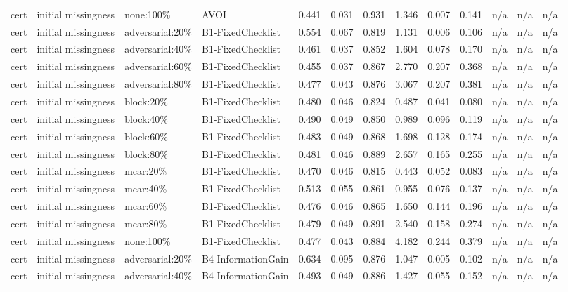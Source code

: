 \begin{table}[!ht]
{\begin{tabular}{lllllllllllll}
cert & initial missingness & none:100\% & AVOI & 0.441 & 0.031 & 0.931 & 1.346 & 0.007 & 0.141 & n/a & n/a & n/a \\
cert & initial missingness & adversarial:20\% & B1-FixedChecklist & 0.554 & 0.067 & 0.819 & 1.131 & 0.006 & 0.106 & n/a & n/a & n/a \\
cert & initial missingness & adversarial:40\% & B1-FixedChecklist & 0.461 & 0.037 & 0.852 & 1.604 & 0.078 & 0.170 & n/a & n/a & n/a \\
cert & initial missingness & adversarial:60\% & B1-FixedChecklist & 0.455 & 0.037 & 0.867 & 2.770 & 0.207 & 0.368 & n/a & n/a & n/a \\
cert & initial missingness & adversarial:80\% & B1-FixedChecklist & 0.477 & 0.043 & 0.876 & 3.067 & 0.207 & 0.381 & n/a & n/a & n/a \\
cert & initial missingness & block:20\% & B1-FixedChecklist & 0.480 & 0.046 & 0.824 & 0.487 & 0.041 & 0.080 & n/a & n/a & n/a \\
cert & initial missingness & block:40\% & B1-FixedChecklist & 0.490 & 0.049 & 0.850 & 0.989 & 0.096 & 0.119 & n/a & n/a & n/a \\
cert & initial missingness & block:60\% & B1-FixedChecklist & 0.483 & 0.049 & 0.868 & 1.698 & 0.128 & 0.174 & n/a & n/a & n/a \\
cert & initial missingness & block:80\% & B1-FixedChecklist & 0.481 & 0.046 & 0.889 & 2.657 & 0.165 & 0.255 & n/a & n/a & n/a \\
cert & initial missingness & mcar:20\% & B1-FixedChecklist & 0.470 & 0.046 & 0.815 & 0.443 & 0.052 & 0.083 & n/a & n/a & n/a \\
cert & initial missingness & mcar:40\% & B1-FixedChecklist & 0.513 & 0.055 & 0.861 & 0.955 & 0.076 & 0.137 & n/a & n/a & n/a \\
cert & initial missingness & mcar:60\% & B1-FixedChecklist & 0.476 & 0.046 & 0.865 & 1.650 & 0.144 & 0.196 & n/a & n/a & n/a \\
cert & initial missingness & mcar:80\% & B1-FixedChecklist & 0.479 & 0.049 & 0.891 & 2.540 & 0.158 & 0.274 & n/a & n/a & n/a \\
cert & initial missingness & none:100\% & B1-FixedChecklist & 0.477 & 0.043 & 0.884 & 4.182 & 0.244 & 0.379 & n/a & n/a & n/a \\
cert & initial missingness & adversarial:20\% & B4-InformationGain & 0.634 & 0.095 & 0.876 & 1.047 & 0.005 & 0.102 & n/a & n/a & n/a \\
cert & initial missingness & adversarial:40\% & B4-InformationGain & 0.493 & 0.049 & 0.886 & 1.427 & 0.055 & 0.152 & n/a & n/a & n/a \\

\end{tabular}}
\end{table}
